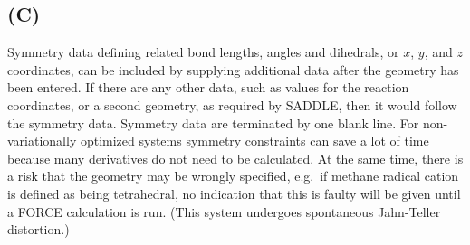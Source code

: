 \subsection*{ (C)}
Symmetry data defining related bond lengths,  angles  and  dihedrals,  or $x$,
$y$, and $z$ coordinates, can  be included by supplying additional data after
the geometry has been entered.  If there are any other data, such as values
for  the  reaction coordinates,  or  a second geometry, as required by SADDLE,
then it would follow the symmetry data.  Symmetry data  are  terminated  by
one  blank line.   For  non-variationally optimized systems symmetry
constraints can save a lot of time because many derivatives do not need to be
calculated. At  the  same  time,  there  is  a  risk that the geometry may be
wrongly specified,  e.g.\   if  methane  radical  cation  is  defined   as
being tetrahedral,  no  indication  that  this  is faulty will be given until a
FORCE calculation is run.  (This system undergoes spontaneous Jahn-Teller
distortion.)
